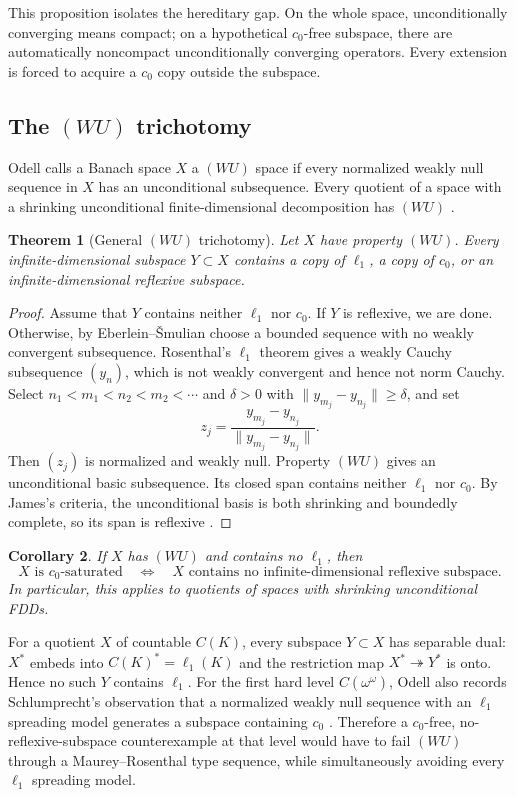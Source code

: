 \documentclass[11pt]{article}
\newtheorem{theorem}{Theorem}[section]
\newtheorem{corollary}[theorem]{Corollary}
\theoremstyle{definition}
\newcommand{\onto}{\twoheadrightarrow}
\begin{document}
This proposition isolates the hereditary gap.  On the whole space,
unconditionally converging means compact; on a hypothetical $c_0$-free
subspace, there are automatically noncompact unconditionally converging
operators.  Every extension is forced to acquire a $c_0$ copy outside the
subspace.

\subsection{The $(WU)$ trichotomy}

Odell calls a Banach space $X$ a $(WU)$ space if every normalized weakly null
sequence in $X$ has an unconditional subsequence.  Every quotient of a space
with a shrinking unconditional finite-dimensional decomposition has $(WU)$
\cite[Theorem~A]{Odell1992}.

\begin{theorem}[General $(WU)$ trichotomy]\label{thm:WU}
Let $X$ have property $(WU)$.  Every infinite-dimensional subspace
$Y\subset X$ contains a copy of $\ell_1$, a copy of $c_0$, or an
infinite-dimensional reflexive subspace.
\end{theorem}

\begin{proof}
Assume that $Y$ contains neither $\ell_1$ nor $c_0$.  If $Y$ is reflexive,
we are done.  Otherwise, by Eberlein--\v{S}mulian choose a bounded sequence
with no weakly convergent subsequence.  Rosenthal's $\ell_1$ theorem gives a
weakly Cauchy subsequence $(y_n)$, which is not weakly convergent and hence
not norm Cauchy.  Select
$n_1<m_1<n_2<m_2<\cdots$ and $\delta>0$ with
$\|y_{m_j}-y_{n_j}\|\ge\delta$, and set
\[
   z_j=\frac{y_{m_j}-y_{n_j}}{\|y_{m_j}-y_{n_j}\|}.
\]
Then $(z_j)$ is normalized and weakly null.  Property $(WU)$ gives an
unconditional basic subsequence.  Its closed span contains neither $\ell_1$
nor $c_0$.  By James's criteria, the unconditional basis is both shrinking
and boundedly complete, so its span is reflexive
\cite{James1950,Rosenthal1974}.
\end{proof}

\begin{corollary}\label{cor:WU}
If $X$ has $(WU)$ and contains no $\ell_1$, then
\[
 X \text{ is }c_0\text{-saturated}
 \quad\Longleftrightarrow\quad
 X \text{ contains no infinite-dimensional reflexive subspace}.
\]
In particular, this applies to quotients of spaces with shrinking
unconditional FDDs.
\end{corollary}

For a quotient $X$ of countable $C(K)$, every subspace $Y\subset X$ has
separable dual: $X^*$ embeds into $C(K)^*=\ell_1(K)$ and the restriction
map $X^*\onto Y^*$ is onto.  Hence no such $Y$ contains $\ell_1$.  For the
first hard level $C(\omega^\omega)$, Odell also records Schlumprecht's
observation that a normalized weakly null sequence with an $\ell_1$
spreading model generates a subspace containing $c_0$
\cite[Section~3]{Odell1992}.  Therefore a $c_0$-free, no-reflexive-subspace
counterexample at that level would have to fail $(WU)$ through a
Maurey--Rosenthal type sequence, while simultaneously avoiding every
$\ell_1$ spreading model.
\end{document}
